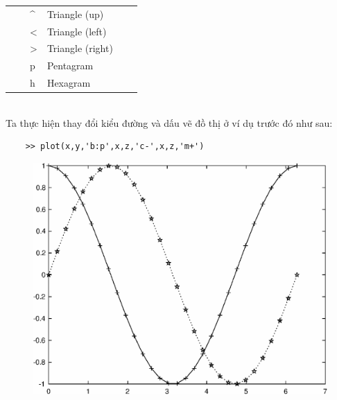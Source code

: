 \documentclass[12pt,a4paper]{article}
\begin{document}
\begin{table}[hp]
\begin{tabular}{|ll|ll|ll|}
\rowcolor[HTML]{DBDBDB} 
                                 &                          & \textasciicircum                & Triangle (up)            &                                 &                                  \\
                                 &                          & \textless                       & Triangle (left)          &                                 &                                  \\
\rowcolor[HTML]{DBDBDB} 
                                 &                          & \textgreater                    & Triangle (right)         &                                 &                                  \\
                                 &                          & p                               & Pentagram                &                                 &                                  \\
\rowcolor[HTML]{DBDBDB} 
                                 &                          & h                               & Hexagram                 &                                 &                                  \\ \hline
\end{tabular}
\end{table}\\
Ta thực hiện thay đổi kiểu đường và dấu vẽ đồ thị ở ví dụ trước đó như sau:
\begin{lstlisting}
	>> plot(x,y,'b:p',x,z,'c-',x,z,'m+')
\end{lstlisting}
\begin{center}
	\begin{figure}[H]
	\begin{center}
		\includegraphics[scale=0.6]{hinhtieuluan/dothi5}
	\end{center}
		\caption{}
		\label{refdothi5}
	\end{figure}
\end{center}
\end{document}
